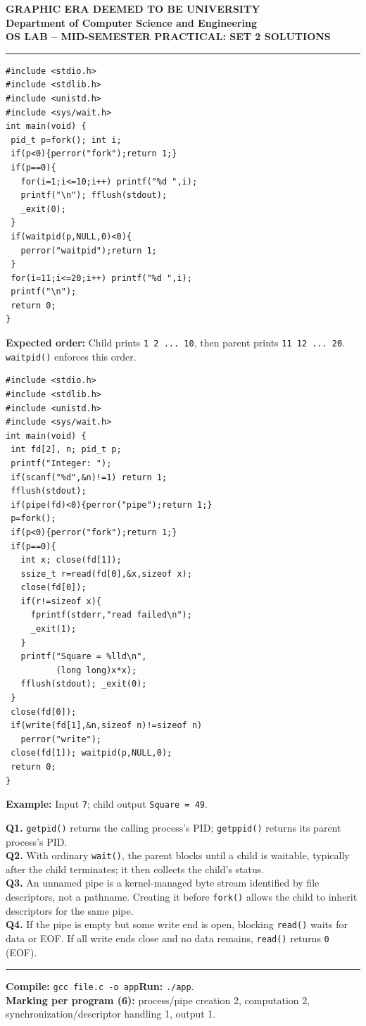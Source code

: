 \documentclass[8pt,a4paper]{extarticle}
\newcommand{\heading}[1]{\begin{center}{\bfseries\large GRAPHIC ERA DEEMED TO BE UNIVERSITY}\\[-1pt]{\bfseries Department of Computer Science and Engineering}\\[-1pt]{\bfseries OS LAB -- MID-SEMESTER PRACTICAL: SET #1 SOLUTIONS}\end{center}\vspace{-5pt}\hrule\vspace{3pt}}
\newcommand{\prog}[1]{\vspace{3pt}{\bfseries #1}\par}
\newcommand{\answers}{\vspace{3pt}{\bfseries Short answers (4 $\times$ 2 marks)}\par}
\begin{document}
\newpage
\heading{2}
\begin{multicols}{2}
\prog{P1 (6 marks): Child 1--10; parent 11--20, synchronized}
\begin{lstlisting}
#include <stdio.h>
#include <stdlib.h>
#include <unistd.h>
#include <sys/wait.h>
int main(void) {
 pid_t p=fork(); int i;
 if(p<0){perror("fork");return 1;}
 if(p==0){
   for(i=1;i<=10;i++) printf("%d ",i);
   printf("\n"); fflush(stdout);
   _exit(0);
 }
 if(waitpid(p,NULL,0)<0){
   perror("waitpid");return 1;
 }
 for(i=11;i<=20;i++) printf("%d ",i);
 printf("\n");
 return 0;
}
\end{lstlisting}
\textbf{Expected order:} Child prints \texttt{1 2 ... 10}, then parent prints \texttt{11 12 ... 20}. \texttt{waitpid()} enforces this order.
\prog{P2 (6 marks): Parent sends integer; child prints square}
\begin{lstlisting}
#include <stdio.h>
#include <stdlib.h>
#include <unistd.h>
#include <sys/wait.h>
int main(void) {
 int fd[2], n; pid_t p;
 printf("Integer: ");
 if(scanf("%d",&n)!=1) return 1;
 fflush(stdout);
 if(pipe(fd)<0){perror("pipe");return 1;}
 p=fork();
 if(p<0){perror("fork");return 1;}
 if(p==0){
   int x; close(fd[1]);
   ssize_t r=read(fd[0],&x,sizeof x);
   close(fd[0]);
   if(r!=sizeof x){
     fprintf(stderr,"read failed\n");
     _exit(1);
   }
   printf("Square = %lld\n",
          (long long)x*x);
   fflush(stdout); _exit(0);
 }
 close(fd[0]);
 if(write(fd[1],&n,sizeof n)!=sizeof n)
   perror("write");
 close(fd[1]); waitpid(p,NULL,0);
 return 0;
}
\end{lstlisting}
\textbf{Example:} Input \texttt{7}; child output \texttt{Square = 49}.
\columnbreak
\answers
\textbf{Q1.} \texttt{getpid()} returns the calling process's PID; \texttt{getppid()} returns its parent process's PID.\\
\textbf{Q2.} With ordinary \texttt{wait()}, the parent blocks until a child is waitable, typically after the child terminates; it then collects the child's status.\\
\textbf{Q3.} An unnamed pipe is a kernel-managed byte stream identified by file descriptors, not a pathname. Creating it before \texttt{fork()} allows the child to inherit descriptors for the same pipe.\\
\textbf{Q4.} If the pipe is empty but some write end is open, blocking \texttt{read()} waits for data or EOF. If all write ends close and no data remains, \texttt{read()} returns \texttt{0} (EOF).
\vspace{5pt}\hrule\vspace{3pt}
\textbf{Compile:} \texttt{gcc file.c -o app}\quad \textbf{Run:} \texttt{./app}.\\
\textbf{Marking per program (6):} process/pipe creation 2, computation 2, synchronization/descriptor handling 1, output 1.
\end{multicols}
\end{document}
